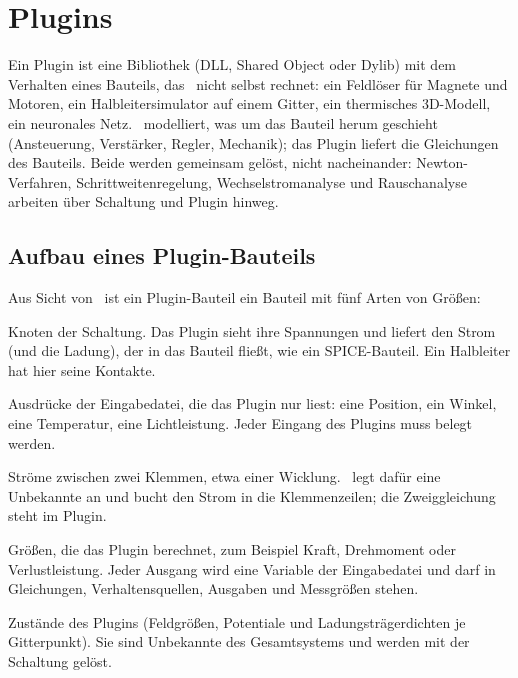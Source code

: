 \chapter{Plugins}
\label{kap:format-plugins}

Ein Plugin ist eine Bibliothek (DLL, Shared Object oder Dylib) mit dem
Verhalten eines Bauteils, das \esim\ nicht selbst rechnet: ein Feldlöser für
Magnete und Motoren, ein Halbleitersimulator auf einem Gitter, ein
thermisches 3D-Modell, ein neuronales Netz. \esim\ modelliert, was um das
Bauteil herum geschieht (Ansteuerung, Verstärker, Regler, Mechanik); das
Plugin liefert die Gleichungen des Bauteils. Beide werden gemeinsam gelöst,
nicht nacheinander: Newton-Verfahren, Schrittweitenregelung,
Wechselstromanalyse und Rauschanalyse arbeiten über Schaltung und Plugin
hinweg.

\section{Aufbau eines Plugin-Bauteils}
\label{sec:plugin-aufbau}

Aus Sicht von \esim\ ist ein Plugin-Bauteil ein Bauteil mit fünf Arten von
Größen:

\begin{description}[style=nextline,leftmargin=2em]
  \item[Klemmen (\code{nodes})] Knoten der Schaltung. Das Plugin sieht ihre
    Spannungen und liefert den Strom (und die Ladung), der in das Bauteil
    fließt, wie ein SPICE-Bauteil. Ein Halbleiter hat hier seine Kontakte.
  \item[Eingänge (\code{inputs})] Ausdrücke der Eingabedatei, die das Plugin
    nur liest: eine Position, ein Winkel, eine Temperatur, eine
    Lichtleistung. Jeder Eingang des Plugins muss belegt werden.
  \item[Zweige] Ströme zwischen zwei Klemmen, etwa einer Wicklung. \esim\ 
    legt dafür eine Unbekannte an und bucht den Strom in die Klemmenzeilen;
    die Zweiggleichung steht im Plugin.
  \item[Ausgänge (\code{outputs})] Größen, die das Plugin berechnet, zum
    Beispiel Kraft, Drehmoment oder Verlustleistung. Jeder Ausgang wird eine
    Variable der Eingabedatei und darf in Gleichungen, Verhaltensquellen,
    Ausgaben und Messgrößen stehen.
  \item[innere Unbekannte] Zustände des Plugins (Feldgrößen, Potentiale und
    Ladungsträgerdichten je Gitterpunkt). Sie sind Unbekannte des
    Gesamtsystems und werden mit der Schaltung gelöst.
\end{description}


